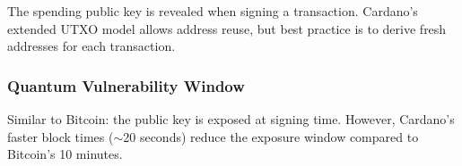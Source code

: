 The spending public key is revealed when signing a transaction.
Cardano's extended UTXO model allows address reuse, but best practice
is to derive fresh addresses for each transaction.

\subsubsection{Quantum Vulnerability Window}

Similar to Bitcoin: the public key is exposed at signing time. However,
Cardano's faster block times ($\sim$20 seconds) reduce the exposure
window compared to Bitcoin's 10 minutes.

